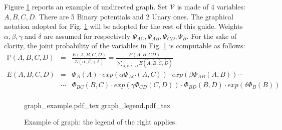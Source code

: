 Figure \ref{fig:00:example} reports an example of undirected graph. Set $\mathcal{V}$ is made of 4 variables: $A,B,C,D$. There are 5 Binary potentials and 2 Unary ones.
The graphical notation adopted for Fig. \ref{fig:00:example} will be adopted for the rest of this guide.
Weights $\alpha, \beta, \gamma$ and $\delta$ are assumed for respectively $\Psi _{AC}, \Psi _{AB}, \Psi _{CD}, \Psi _{B}$.
For the sake of clarity, the joint probability of the variables in Fig. \ref{fig:00:example} is computable as follows:
\begin{eqnarray}
\mathbb{P}(A,B,C,D) &=& \frac{E(A,B,C,D)}{\mathcal{Z}(\alpha, \beta, \gamma, \delta)} = 
\frac{E(A,B,CD)}{\sum_{\tilde{A}, \tilde{B}, \tilde{C}, \tilde{D}} E(\tilde{A}, \tilde{B}, \tilde{C}, \tilde{D})} \nonumber\\
E(A,B,C,D) &=& \Phi _{A}(A) \cdot exp(\alpha \Phi _{AC}(A,C))   \cdot exp(\beta \Phi _{AB}(A,B)) \cdots \nonumber\\
& \cdots &
\Phi _{BC}(B,C)  \cdot exp(\gamma \Phi _{CD}(C,D)) \cdot \Phi _{BD}(B,D)  \cdot exp(\delta \Phi _{B}(B))
\nonumber\\
\end{eqnarray}



\begin{figure}
	\centering
\def\svgwidth{0.4 \columnwidth}
{graph_example.pdf_tex} 
\quad
\def\svgwidth{0.3 \columnwidth}
{graph_legend.pdf_tex} 
	\caption{Example of graph: the legend of the right applies.}
	\label{fig:00:example}
\end{figure} 


